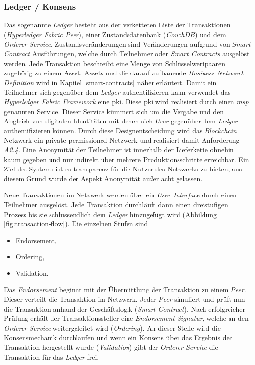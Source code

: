 \subsubsection{Ledger / Konsens}
Das sogenannte \textit{Ledger} besteht aus der verketteten Liste der Transaktionen (\textit{Hyperledger Fabric Peer}), einer Zustandsdatenbank (\textit{CouchDB}) und dem \textit{Orderer Service}. Zustandsveränderungen sind Veränderungen aufgrund von \textit{Smart Contract} Ausführungen, welche durch Teilnehmer oder \textit{Smart Contracts} ausgelöst werden. Jede Transaktion beschreibt eine Menge von Schlüsselwertpaaren zugehörig zu einem Asset. Assets und die darauf aufbauende \textit{Business Netzwerk Definition} wird in Kapitel \ref{smart-contracts} näher erläutert. Damit ein Teilnehmer sich gegenüber dem \textit{Ledger} authentifizieren kann verwendet das \textit{Hyperledger Fabric Framework} eine \acf{pki}. Diese \ac{pki} wird realisiert durch einen \textit{\ac{msp}} genannten Service. Dieser Service kümmert sich um die Vergabe und den Abgleich von digitalen Identitäten mit denen sich \textit{User} gegenüber dem \textit{Ledger} authentifizieren können. Durch diese Designentscheidung wird das \textit{Blockchain} Netzwerk ein private permissioned Netzwerk und realisiert damit Anforderung \textit{A2.4}. Eine Anonymität der Teilnehmer ist innerhalb der Lieferkette ohnehin kaum gegeben und nur indirekt über mehrere Produktionsschritte erreichbar. Ein Ziel des Systems ist es transparenz für die Nutzer des Netzwerks zu bieten, aus diesem Grund wurde der Aspekt Anonymität außer acht gelassen. 

Neue Transaktionen im Netzwerk werden über ein \textit{User Interface} durch einen Teilnehmer ausgelöst. Jede Transaktion durchläuft dann einen dreistufigen Prozess bis sie schlussendlich dem \textit{Ledger} hinzugefügt wird (Abbildung \ref{fig:transaction-flow}). Die einzelnen Stufen sind 

\begin{itemize}
	\item Endorsement,
	\item Ordering,
	\item Validation.
\end{itemize}

\noindent
Das \textit{Endorsement} beginnt mit der Übermittlung der Transaktion zu einem \textit{Peer}. Dieser verteilt die Transaktion im Netzwerk. Jeder \textit{Peer} simuliert und prüft nun die Transaktion anhand der Geschäftslogik (\textit{Smart Contract}). Nach erfolgreicher Prüfung erhält der Transaktionssteller eine \textit{Endorsement Signatur}, welche an den \textit{Orderer Service} weitergeleitet wird (\textit{Ordering}). An dieser Stelle wird die Konsensmechanik durchlaufen und wenn ein Konsens über das Ergebnis der Transaktion hergestellt wurde (\textit{Validation}) gibt der \textit{Orderer Service} die Transaktion für das \textit{Ledger} frei.


